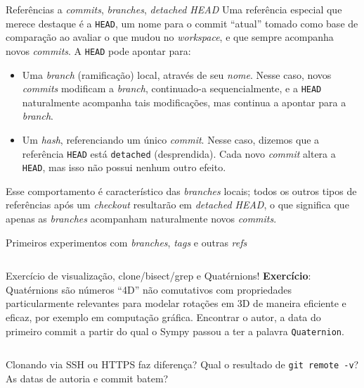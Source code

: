 \documentclass[utf8]{beamer}
\begin{document}
\begin{frame}{Referências a \emph{commits}, \emph{branches},
              \emph{detached HEAD}}
  Uma referência especial que merece destaque é a \texttt{HEAD},
  um nome para o commit ``atual'' tomado como base de comparação
  ao avaliar o que mudou no \emph{workspace},
  e que sempre acompanha novos \emph{commits}.
  A \texttt{HEAD} pode apontar para:
  \begin{itemize}
    \item
      Uma \emph{branch} (ramificação) local,
      através de seu \emph{nome}.
      Nesse caso, novos \emph{commits} modificam a \emph{branch},
      continuado-a sequencialmente,
      e a \texttt{HEAD} naturalmente acompanha tais modificações,
      mas continua a apontar para a \emph{branch}.
    \item Um \emph{hash}, referenciando um único \emph{commit}.
      Nesse caso, dizemos que a referência \texttt{HEAD}
      está \texttt{detached} (desprendida).
      Cada novo \emph{commit} altera a \texttt{HEAD},
      mas isso não possui nenhum outro efeito.
  \end{itemize}
  Esse comportamento é característico das \emph{branches} locais;
  todos os outros tipos de referências após um \emph{checkout}
  resultarão em \emph{detached HEAD},
  o que significa que apenas as \emph{branches}
  acompanham naturalmente novos \emph{commits}.
\end{frame}

\begin{frame}[fragile]{Primeiros experimentos com \emph{branches},
                       \emph{tags} e outras \emph{refs}}
  \vspace{-.8em}%
  \inputminted{bash}{03_refs.sh}
\end{frame}

\begin{frame}[fragile]{Exercício de visualização, clone/bisect/grep
                       e Quatérnions!}
  \textbf{Exercício}:
  Quatérnions são números ``4D'' não comutativos
  com propriedades particularmente relevantes
  para modelar rotações em 3D de maneira eficiente e eficaz,
  por exemplo em computação gráfica.
  Encontrar o autor, a data do primeiro commit
  a partir do qual o Sympy passou a ter a palavra \texttt{Quaternion}.
  \inputminted{bash}{04_bisect_exercise.sh}

  Clonando via SSH ou HTTPS faz diferença?
  Qual o resultado de \texttt{git remote -v}?
  As datas de autoria e commit batem?
\end{frame}
\end{document}
